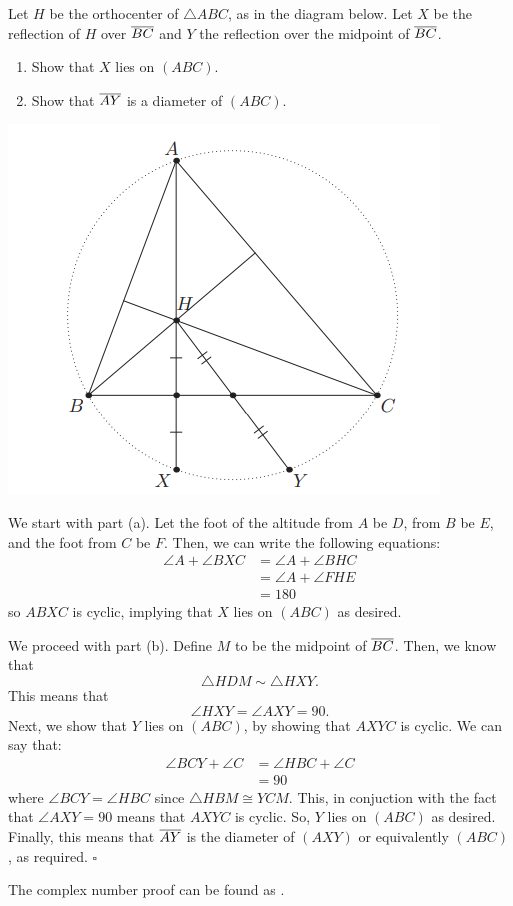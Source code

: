 \documentclass{article}
\begin{document}
\begin{problem}[1.17]{}
Let $H$ be the orthocenter of $\triangle ABC$, as in the diagram below. Let $X$ be the reflection of $H$ over $\overline{BC}$ and $Y$ the reflection over the midpoint of $\overline{BC}$.
\begin{enumerate}[label=(\alph*)]
    \item Show that $X$ lies on $(ABC)$.
    \item Show that $\overline{AY}$ is a diameter of $(ABC)$.
\end{enumerate}

\begin{center}
\includegraphics[width=0.35\linewidth]{Figure 1.3B.png}
\end{center}
\end{problem}
We start with part (a). Let the foot of the altitude from $A$ be $D$, from $B$ be $E$, and the foot from $C$ be $F$. Then, we can write the following equations:
\begin{align*}
\angle A + \angle BXC &= \angle A + \angle BHC \\
&= \angle A + \angle FHE \\
&= 180
\end{align*}
so $ABXC$ is cyclic, implying that $X$ lies on $(ABC)$ as desired. 

We proceed with part (b). Define $M$ to be the midpoint of $\overline{BC}$. Then, we know that \[\triangle HDM \sim \triangle HXY.\] This means that \[\angle HXY = \angle AXY = 90.\] Next, we show that $Y$ lies on $(ABC)$, by showing that $AXYC$ is cyclic. We can say that:
\begin{align*}
\angle BCY + \angle C &= \angle HBC + \angle C \\
&= 90
\end{align*}
where $\angle BCY = \angle HBC$ since $\triangle HBM \cong YCM$. This, in conjuction with the fact that $\angle AXY = 90$ means that $AXYC$ is cyclic. So, $Y$ lies on $(ABC)$ as desired. Finally, this means that $\overline{AY}$ is the diameter of $(AXY)$ or equivalently $(ABC)$, as required. $\square$

\begin{remark*}
The complex number proof can be found as .
\end{remark*}
\end{document}

